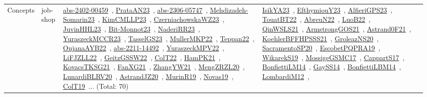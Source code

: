 {\begin{longtable}{lp{3cm}>{\raggedright\arraybackslash}p{6cm}>{\raggedright\arraybackslash}p{6cm}>{\raggedright\arraybackslash}p{8cm}}
Concepts & job-shop & \href{articles/abs-2402-00459.pdf}{abs-2402-00459}~\cite{abs-2402-00459}, \href{articles/PrataAN23.pdf}{PrataAN23}~\cite{PrataAN23}, \href{articles/abs-2306-05747.pdf}{abs-2306-05747}~\cite{abs-2306-05747}, \href{papers/Mehdizadeh-Somarin23.pdf}{Mehdizadeh-Somarin23}~\cite{Mehdizadeh-Somarin23}, \href{papers/KimCMLLP23.pdf}{KimCMLLP23}~\cite{KimCMLLP23}, \href{articles/CzerniachowskaWZ23.pdf}{CzerniachowskaWZ23}~\cite{CzerniachowskaWZ23}, \href{papers/JuvinHHL23.pdf}{JuvinHHL23}~\cite{JuvinHHL23}, \href{papers/Bit-Monnot23.pdf}{Bit-Monnot23}~\cite{Bit-Monnot23}, \href{articles/NaderiRR23.pdf}{NaderiRR23}~\cite{NaderiRR23}, \href{articles/YuraszeckMCCR23.pdf}{YuraszeckMCCR23}~\cite{YuraszeckMCCR23}, \href{papers/TasselGS23.pdf}{TasselGS23}~\cite{TasselGS23}, \href{articles/MullerMKP22.pdf}{MullerMKP22}~\cite{MullerMKP22}, \href{papers/Teppan22.pdf}{Teppan22}~\cite{Teppan22}, \href{papers/OujanaAYB22.pdf}{OujanaAYB22}~\cite{OujanaAYB22}, \href{articles/abs-2211-14492.pdf}{abs-2211-14492}~\cite{abs-2211-14492}, \href{articles/YuraszeckMPV22.pdf}{YuraszeckMPV22}~\cite{YuraszeckMPV22}, \href{papers/LiFJZLL22.pdf}{LiFJZLL22}~\cite{LiFJZLL22}, \href{papers/GeitzGSSW22.pdf}{GeitzGSSW22}~\cite{GeitzGSSW22}, \href{articles/ColT22.pdf}{ColT22}~\cite{ColT22}, \href{articles/HamPK21.pdf}{HamPK21}~\cite{HamPK21}, \href{papers/KovacsTKSG21.pdf}{KovacsTKSG21}~\cite{KovacsTKSG21}, \href{articles/FanXG21.pdf}{FanXG21}~\cite{FanXG21}, \href{articles/ZhangYW21.pdf}{ZhangYW21}~\cite{ZhangYW21}, \href{articles/MengZRZL20.pdf}{MengZRZL20}~\cite{MengZRZL20}, \href{articles/LunardiBLRV20.pdf}{LunardiBLRV20}~\cite{LunardiBLRV20}, \href{articles/AstrandJZ20.pdf}{AstrandJZ20}~\cite{AstrandJZ20}, \href{papers/MurinR19.pdf}{MurinR19}~\cite{MurinR19}, \href{articles/Novas19.pdf}{Novas19}~\cite{Novas19}, \href{papers/ColT19.pdf}{ColT19}~\cite{ColT19}... (Total: 70) & \href{articles/IsikYA23.pdf}{IsikYA23}~\cite{IsikYA23}, \href{papers/EfthymiouY23.pdf}{EfthymiouY23}~\cite{EfthymiouY23}, \href{articles/AlfieriGPS23.pdf}{AlfieriGPS23}~\cite{AlfieriGPS23}, \href{papers/TouatBT22.pdf}{TouatBT22}~\cite{TouatBT22}, \href{articles/AbreuN22.pdf}{AbreuN22}~\cite{AbreuN22}, \href{papers/LuoB22.pdf}{LuoB22}~\cite{LuoB22}, \href{articles/QinWSLS21.pdf}{QinWSLS21}~\cite{QinWSLS21}, \href{papers/ArmstrongGOS21.pdf}{ArmstrongGOS21}~\cite{ArmstrongGOS21}, \href{papers/Astrand0F21.pdf}{Astrand0F21}~\cite{Astrand0F21}, \href{articles/KoehlerBFFHPSSS21.pdf}{KoehlerBFFHPSSS21}~\cite{KoehlerBFFHPSSS21}, \href{papers/GroleazNS20.pdf}{GroleazNS20}~\cite{GroleazNS20}, \href{articles/SacramentoSP20.pdf}{SacramentoSP20}~\cite{SacramentoSP20}, \href{articles/EscobetPQPRA19.pdf}{EscobetPQPRA19}~\cite{EscobetPQPRA19}, \href{articles/WikarekS19.pdf}{WikarekS19}~\cite{WikarekS19}, \href{papers/MossigeGSMC17.pdf}{MossigeGSMC17}~\cite{MossigeGSMC17}, \href{papers/CappartS17.pdf}{CappartS17}~\cite{CappartS17}, \href{papers/BonfiettiLM14.pdf}{BonfiettiLM14}~\cite{BonfiettiLM14}, \href{papers/GaySS14.pdf}{GaySS14}~\cite{GaySS14}, \href{articles/BonfiettiLBM14.pdf}{BonfiettiLBM14}~\cite{BonfiettiLBM14}, \href{articles/LombardiM12.pdf}{LombardiM12}~\cite{LombardiM12}, 
\end{longtable}}

